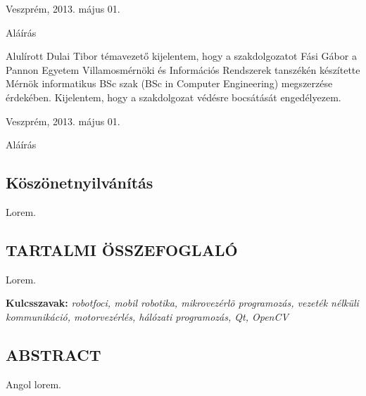 \documentclass[a4paper,12pt,oneside]{report}
\begin{document}
\begin{flushleft}
{Veszprém, 2013. május 01.\\}
\end{flushleft}

\begin{flushright}
{Aláírás \vspace{4cm}}
\end{flushright}

{Alulírott Dulai Tibor témavezető kijelentem, hogy a szakdolgozatot Fási Gábor a Pannon Egyetem Villamosmérnöki és Információs Rendszerek tanszékén készítette Mérnök informatikus BSc szak (BSc in Computer Engineering) megszerzése érdekében.
Kijelentem, hogy a szakdolgozat védésre bocsátását engedélyezem.
\newline}

\begin{flushleft}
{Veszprém, 2013. május 01. \newline}
\end{flushleft}

\begin{flushright}
{Aláírás}
\end{flushright}
\newpage
\pagebreak
\begin{center}
\section*{Köszönetnyilvánítás}
\end{center}
Lorem.
\newpage

\begin{center}
\section*{\textbf{\Large \MakeUppercase{Tartalmi összefoglaló}}}
\end{center}
{
Lorem.
\vspace{4cm}\\}

{\bf Kulcsszavak:} {\it robotfoci, mobil robotika, mikrovezérlõ
programozás, vezeték nélküli kommunikáció, motorvezérlés, hálózati
programozás, Qt, OpenCV }
\newpage

\newpage

\begin{center}
\section*{\textbf{\Large \MakeUppercase{Abstract}}}
\end{center}
{
Angol lorem.
\vspace{15mm}\\}
\end{document}
